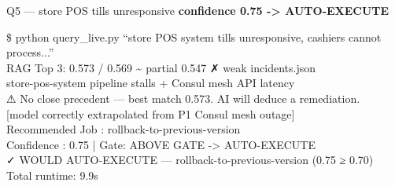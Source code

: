 \begin{frame}{Q5 — store POS tills unresponsive}
  {\color{cteal}\ttfamily\small\bfseries confidence 0.75 -> AUTO-EXECUTE}
  \vspace{0.15cm}
  \begin{terminal}
    \$ python query\_live.py ``store POS system tills unresponsive, cashiers cannot process...''\\

    RAG Top 3: {\color{cauto}0.573 / 0.569 \textasciitilde{} partial}  {\color{camber}0.547 ✗ weak}  incidents.json\\
    \hspace*{0.4cm}store-pos-system pipeline stalls + Consul mesh API latency\\

    ⚠ No close precedent — best match 0.573. AI will deduce a remediation.\\
    \hspace*{0.4cm}[model correctly extrapolated from P1 Consul mesh outage]\\

    Recommended Job : {\color{cauto}rollback-to-previous-version}\\
    Confidence      : {\color{cauto}0.75}  |  Gate: {\color{cauto}ABOVE GATE -> AUTO-EXECUTE}\\

    {\color{cauto}✓ WOULD AUTO-EXECUTE  —  rollback-to-previous-version  (0.75 ≥ 0.70)}\\
    Total runtime: 9.9s
  \end{terminal}
\end{frame}


